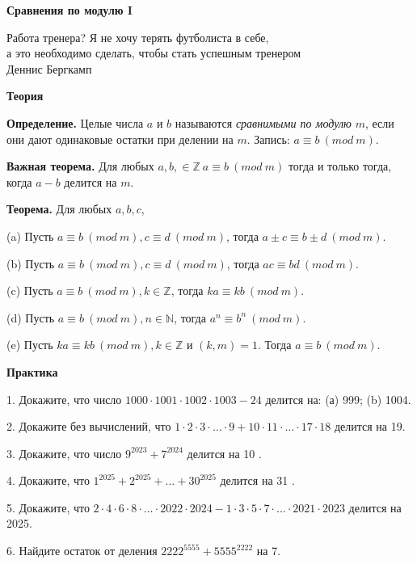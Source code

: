 \centerline{\bf \Huge Сравнения по модулю I}

\begin{flushright}
        \scriptsize{Работа тренера? Я не хочу терять футболиста в себе,\\ а это необходимо сделать, чтобы стать успешным тренером\\Деннис Бергкамп}
\end{flushright}

\textbf{\Large Теория}

\textbf{Определение.} Целые числа $a$ и $b$ называются \textit{сравнимыми по модулю} $m$, если они дают одинаковые остатки при делении на $m$. Запись: $a \equiv b\ (mod \ m)$.

\textbf{Важная теорема.} Для любых $a, b, \in \mathbb{Z} \ a \equiv b\ (mod \ m)$ тогда и только тогда, когда $a-b$ делится на $m$.

\textbf{Теорема.} Для любых $a, b, c$,

(a) Пусть $a \equiv b\ (mod \ m), c \equiv d\ (mod \ m)$, тогда $a \pm c \equiv b \pm d \ (mod \ m)$.

(b) Пусть $a \equiv b\ (mod \ m), c \equiv d\ (mod \ m)$, тогда $a c \equiv b d \ (mod \ m)$.

(c) Пусть $a \equiv b\ (mod \ m), k \in \mathbb{Z}$, тогда $k a \equiv k b\ (mod \ m)$.

(d) Пусть $a \equiv b\ (mod \ m), n \in \mathbb{N}$, тогда $a^n \equiv b^n\ (mod \ m)$.

(e) Пусть $k a \equiv k b\ (mod \ m), k \in \mathbb{Z}$ и $(k, m)=1$. Тогда $a \equiv b\ (mod \ m)$.

\textbf{\Large Практика}

1. Докажите, что число $1000 \cdot 1001 \cdot 1002 \cdot 1003-24$ делится на: (а) 999; (b) 1004.

2. Докажите без вычислений, что $1 \cdot 2 \cdot 3 \cdot \ldots \cdot 9+10 \cdot 11 \cdot \ldots \cdot 17 \cdot 18$ делится на 19.

3. Докажите, что число $9^{2023}+7^{2024}$ делится на 10 .

4. Докажите, что $1^{2025}+2^{2025}+\ldots+30^{2025}$ делится на 31 .

5. Докажите, что $2 \cdot 4 \cdot 6 \cdot 8 \cdot \ldots \cdot 2022 \cdot 2024-1 \cdot 3 \cdot 5 \cdot 7 \cdot \ldots \cdot 2021 \cdot 2023$ делится на 2025.

6. Найдите остаток от деления $2222^{5555}+5555^{2222}$ на 7.
